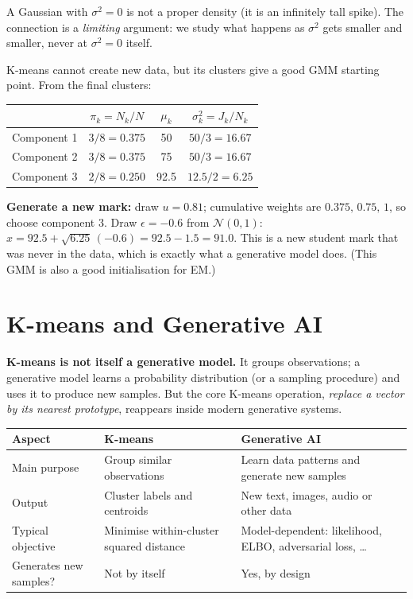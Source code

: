 \documentclass[11pt,a4paper]{article}
\newcommand{\N}{\mathcal{N}}
\begin{document}
\begin{caution}
A Gaussian with $\sigma^2=0$ is not a proper density (it is an infinitely tall spike). The connection is a \emph{limiting} argument: we study what happens as $\sigma^2$ gets smaller and smaller, never at $\sigma^2=0$ itself.
\end{caution}

\begin{example}
K-means cannot create new data, but its clusters give a good GMM starting point. From the final clusters:
\begin{center}
\begin{tabular}{@{}lccc@{}}
\toprule
& $\pi_k=N_k/N$ & $\mu_k$ & $\sigma_k^2=J_k/N_k$\\
\midrule
Component 1 & $3/8=0.375$ & 50 & $50/3=16.67$\\
Component 2 & $3/8=0.375$ & 75 & $50/3=16.67$\\
Component 3 & $2/8=0.250$ & 92.5 & $12.5/2=6.25$\\
\bottomrule
\end{tabular}
\end{center}
\textbf{Generate a new mark:} draw $u=0.81$; cumulative weights are $0.375,\,0.75,\,1$, so choose component 3. Draw $\epsilon=-0.6$ from $\N(0,1)$: $x=92.5+\sqrt{6.25}\,(-0.6)=92.5-1.5=91.0$. This is a new student mark that was never in the data, which is exactly what a generative model does. (This GMM is also a good initialisation for EM.)
\end{example}

\section{K-means and Generative AI}

\textbf{K-means is not itself a generative model.} It groups observations; a generative model learns a probability distribution (or a sampling procedure) and uses it to produce new samples. But the core K-means operation, \emph{replace a vector by its nearest prototype}, reappears inside modern generative systems.

\begin{center}
\renewcommand{\arraystretch}{1.15}
\begin{tabular}{@{}p{3.2cm}p{5.4cm}p{6.2cm}@{}}
\toprule
Aspect & K-means & Generative AI\\
\midrule
Main purpose & Group similar observations & Learn data patterns and generate new samples\\
Output & Cluster labels and centroids & New text, images, audio or other data\\
Typical objective & Minimise within-cluster squared distance & Model-dependent: likelihood, ELBO, adversarial loss, \dots\\
Generates new samples? & Not by itself & Yes, by design\\
\bottomrule
\end{tabular}
\end{center}
\end{document}
